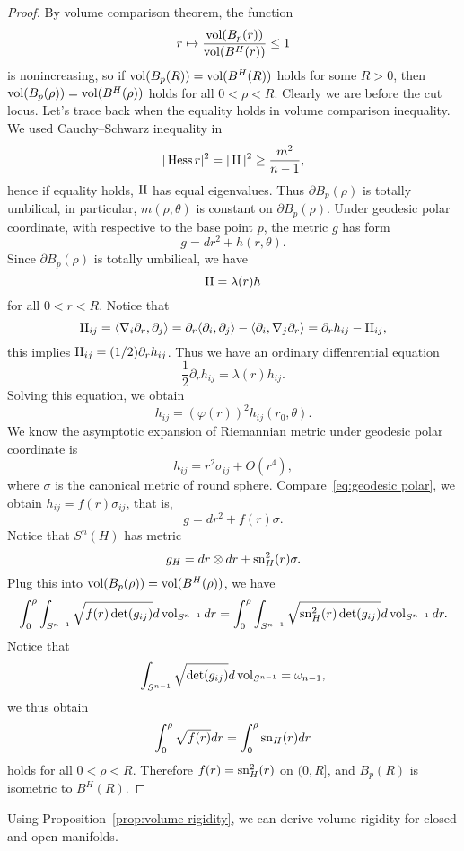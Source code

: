 \begin{proof}
    By volume comparison theorem, the function
    \[r\mapsto\frac{\operatorname{vol}(B_p(r))}{\operatorname{vol}(B^H(r))}\leq 1\]
    is nonincreasing, so if $\operatorname{vol}(B_p(R))=\operatorname{vol}(B^H(R))$ holds for some $R>0$, then $\operatorname{vol}(B_p(\rho))=\operatorname{vol}(B^H(\rho))$ holds for all $0<\rho<R$.
    Clearly we are before the cut locus.
    Let's trace back when the equality holds in volume comparison inequality.
    We used Cauchy--Schwarz inequality in
    \[|\operatorname{Hess}{r}|^2=|\operatorname{II}|^2\geq\frac{m^2}{n-1},\]
    hence if equality holds, $\operatorname{II}$ has equal eigenvalues.
    Thus $\partial B_p(\rho)$ is totally umbilical, in particular, $m(\rho,\theta)$ is constant on $\partial B_p(\rho)$.
    Under geodesic polar coordinate, with respective to the base point $p$, the metric $g$ has form
    \[g=dr^2+h(r,\theta).\]
    Since $\partial B_p(\rho)$ is totally umbilical, we have
    \[\operatorname{II}=\lambda(r)h\]
    for all $0<r<R$.
    Notice that
    \[\operatorname{II}_{ij}=\langle\nabla_i\partial_r,\partial_j\rangle=\partial_r\langle\partial_i,\partial_j\rangle-\langle\partial_i,\nabla_j\partial_r\rangle=\partial_rh_{ij}-\operatorname{II}_{ij},\]
    this implies $\operatorname{II}_{ij}=(1/2)\partial_{r}h_{ij}$.
    Thus we have an ordinary diffenrential equation
    \[\frac{1}{2}\partial_rh_{ij}=\lambda(r)h_{ij}.\]
    Solving this equation, we obtain
    \begin{equation}
        h_{ij}=(\varphi(r))^2h_{ij}(r_0,\theta).\label{eq:geodesic polar}
    \end{equation}
    We know the asymptotic expansion of Riemannian metric under geodesic polar coordinate is
    \[h_{ij}=r^2\sigma_{ij}+O(r^4),\]
    where $\sigma$ is the canonical metric of round sphere.
    Compare~\eqref{eq:geodesic polar}, we obtain $h_{ij}=f(r)\sigma_{ij}$, that is,
    \[g=dr^2+f(r)\sigma.\]
    Notice that $S^n(H)$ has metric
    \[g_H=dr\otimes dr+\operatorname{sn}^2_H(r)\sigma.\]
    Plug this into $\operatorname{vol}(B_p(\rho))=\operatorname{vol}(B^H(\rho))$, we have
    \[\int_0^\rho\int_{S^{n-1}}\sqrt{f(r)\det(g_{ij})}d\operatorname{vol}_{S^{n-1}}dr=\int_0^\rho\int_{S^{n-1}}\sqrt{\operatorname{sn}^2_H(r)\det(g_{ij})}d\operatorname{vol}_{S^{n-1}}dr.\]
    Notice that
    \[\int_{S^{n-1}}\sqrt{\det(g_{ij})}d\operatorname{vol}_{S^{n-1}}=\omega_{n-1},\]
    we thus obtain
    \[\int_0^\rho\sqrt{f(r)}dr=\int_0^\rho{\operatorname{sn}_H(r)}dr\]
    holds for all $0<\rho<R$.
    Therefore $f(r)=\operatorname{sn}^2_H(r)$ on $(0,R]$, and $B_p(R)$ is isometric to $B^H(R)$.
\end{proof}

Using Proposition~\ref{prop:volume rigidity}, we can derive volume rigidity for closed and open manifolds.

